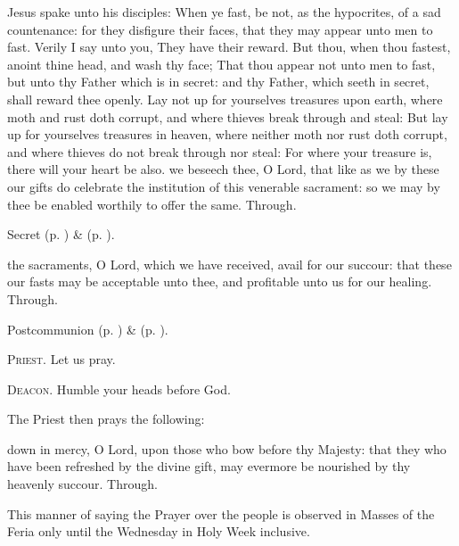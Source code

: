  Jesus spake unto his disciples: When ye fast, be not, as the hypocrites, of a sad countenance: for they disfigure their faces, that they may appear unto men to fast. Verily I say unto you, They have their reward. But thou, when thou fastest, anoint thine head, and wash thy face; That thou appear not unto men to fast, but unto thy Father which is in secret: and thy Father, which seeth in secret, shall reward thee openly. Lay not up for yourselves treasures upon earth, where moth and rust doth corrupt, and where thieves break through and steal: But lay up for yourselves treasures in heaven, where neither moth nor rust doth corrupt, and where thieves do not break through nor steal: For where your treasure is, there will your heart be also.
\secret\label{AshWednesdayMassSecret}
 we beseech thee, O Lord, that like as we by these our gifts do celebrate the institution of this venerable sacrament: so we may by thee be enabled worthily to offer the same. Through.

\begin{rubric}
     Secret  (p. \pageref{SPSaints}) \&   (p. \pageref{SPLivingDeparted}).
\end{rubric}

\postcommunion\label{AshWednesdayMassPostcommunion}
 the sacraments, O Lord, which we have received, avail for our succour: that these our fasts may be acceptable unto thee, and profitable unto us for our healing. Through.
\begin{rubric}
     Postcommunion  (p. \pageref{SPSaints}) \&   (p. \pageref{SPLivingDeparted}).
\end{rubric}

\textsc{Priest.} Let us pray.\par
\textsc{Deacon.} Humble your heads before God.\par
\begin{rubric}
    The Priest then prays the following:
\end{rubric}
 down in mercy, O Lord, upon those who bow before thy Majesty: that they who have been refreshed by the divine gift, may evermore be nourished by thy heavenly succour. Through.
\begin{rubric}
This manner of saying the Prayer over the people is observed in Masses of the Feria only until the Wednesday in Holy Week inclusive.
\end{rubric}


